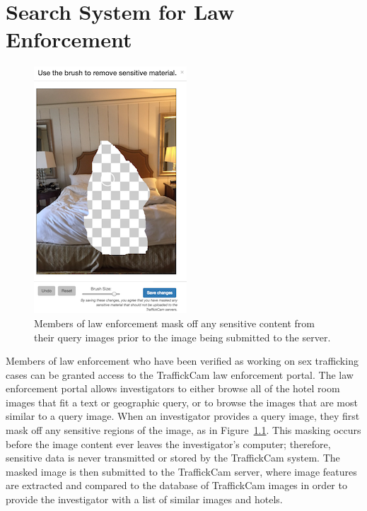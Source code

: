 
\chapter{Search System for Law Enforcement}
\label{ch:7}

\begin{figure}[Ht!]
  \begin{center}
    \includegraphics[width=.7\columnwidth]{figures/chapter7/masking.png}
 \end{center}
  \caption{Members of law enforcement mask off any sensitive content from their query images prior to the image being submitted to the server.}
  \label{fig:masking}
\end{figure}

Members of law enforcement who have been verified as working on sex trafficking cases can be granted access to the TraffickCam law enforcement portal. The law enforcement portal allows investigators to either browse all of the hotel room images that fit a text or geographic query, or to browse the images that are most similar to a query image. When an investigator provides a query image, they first mask off any sensitive regions of the image, as in Figure~\ref{fig:masking}. This masking occurs before the image content ever leaves the investigator's computer; therefore, sensitive data is never transmitted or stored by the TraffickCam system. The masked image is then submitted to the TraffickCam server, where image features are extracted and compared to the database of TraffickCam images in order to provide the investigator with a list of similar images and hotels.

